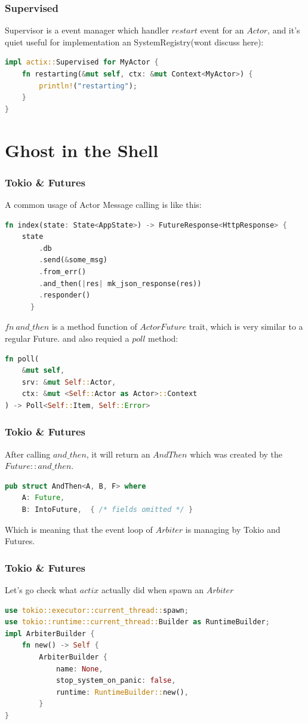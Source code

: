 \documentclass[notheorems, aspectratio=54]{beamer}
\begin{document}
\begin{frame}[fragile]
  \frametitle{Supervised}
  Supervisor is a event manager which handler $restart$ event for an $Actor$, and it's quiet useful for implementation an SystemRegistry(wont discuss here):
  \begin{lstlisting}[language=Rust]
impl actix::Supervised for MyActor {
    fn restarting(&mut self, ctx: &mut Context<MyActor>) {
        println!("restarting");
    }
}
  \end{lstlisting}

\end{frame}



\section{Ghost in the Shell}

\begin{frame}[fragile]
  \frametitle{Tokio \& Futures}
  A common usage of Actor Message calling is like this:
  \begin{lstlisting}[language=Rust]
  fn index(state: State<AppState>) -> FutureResponse<HttpResponse> {
    state
        .db
        .send(&some_msg)
        .from_err()
        .and_then(|res| mk_json_response(res))
        .responder()
      }
    \end{lstlisting}

    $fn\ and\_then$ is a method function of $ActorFuture$ trait, which is very similar to a regular Future.
    and also requied a $poll$ method:
    \begin{lstlisting}[language=Rust]
fn poll(
    &mut self,
    srv: &mut Self::Actor,
    ctx: &mut <Self::Actor as Actor>::Context
) -> Poll<Self::Item, Self::Error>
\end{lstlisting}
\end{frame}

\begin{frame}[fragile]
  \frametitle{Tokio \& Futures}
  After calling $and\_then$, it will return an $AndThen$ which was created by the $Future::and\_then$.
  \begin{lstlisting}[language=Rust]
  pub struct AndThen<A, B, F> where
    A: Future,
    B: IntoFuture,  { /* fields omitted */ }
  \end{lstlisting}
  Which is meaning that the event loop of $Arbiter$ is managing by Tokio and Futures.
\end{frame}

\begin{frame}[fragile]
  \frametitle{Tokio \& Futures}
  Let's go check what $actix$ actually did when spawn an $Arbiter$
  \begin{lstlisting}[language=Rust]
use tokio::executor::current_thread::spawn;
use tokio::runtime::current_thread::Builder as RuntimeBuilder;
impl ArbiterBuilder {
    fn new() -> Self {
        ArbiterBuilder {
            name: None,
            stop_system_on_panic: false,
            runtime: RuntimeBuilder::new(),
        }
}
  \end{lstlisting}
\end{frame}
\end{document}
